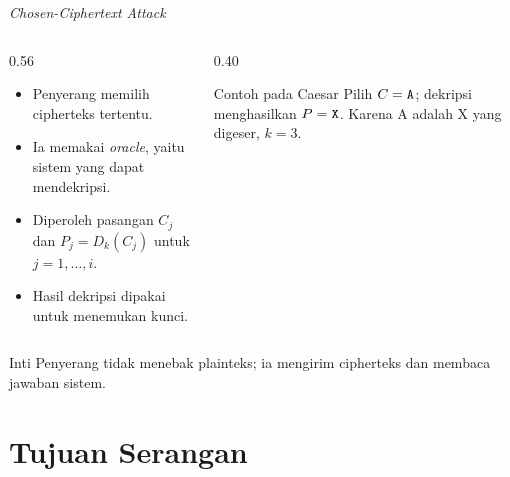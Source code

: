\documentclass[aspectratio=169,11pt]{beamer}
\begin{document}
\begin{frame}{\textit{Chosen-Ciphertext Attack}}
    \begin{columns}[T,onlytextwidth]
        \begin{column}{0.56\textwidth}
            \begin{itemize}
                \item Penyerang memilih cipherteks tertentu.
                \item Ia memakai \textit{oracle}, yaitu sistem yang dapat
                      mendekripsi.
                \item Diperoleh pasangan $C_j$ dan $P_j=D_k(C_j)$ untuk
                      $j=1,\dots,i$.
                \item Hasil dekripsi dipakai untuk menemukan kunci.
            \end{itemize}
        \end{column}
        \begin{column}{0.40\textwidth}
            \begin{exampleblock}{Contoh pada Caesar}
                \footnotesize
                Pilih $C=\texttt{A}$; dekripsi menghasilkan $P=\texttt{X}$.
                Karena A adalah X yang digeser, $k=3$.
            \end{exampleblock}
        \end{column}
    \end{columns}
    \vspace{0.15cm}
    \begin{alertblock}{Inti}
        Penyerang tidak menebak plainteks; ia mengirim cipherteks dan membaca
        jawaban sistem.
    \end{alertblock}
\end{frame}

\section{Tujuan Serangan}
\end{document}
